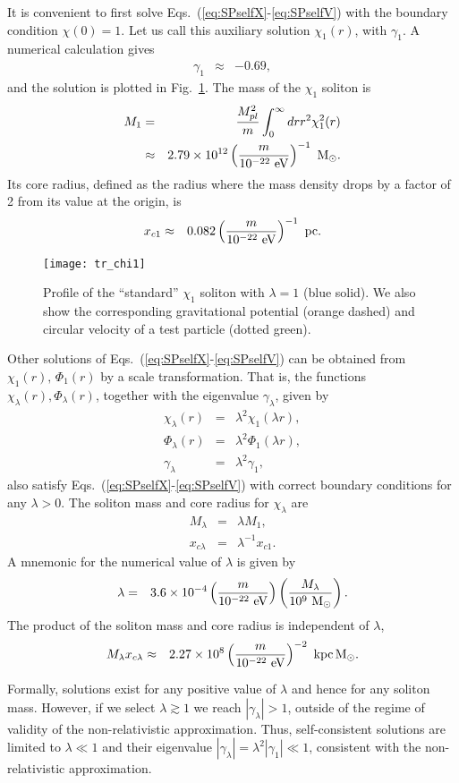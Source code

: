 \documentclass[aps,prd,floats,superscriptaddress,showpacs,nofootinbib,twocolumn,preprintnumbers]{revtex4-1}%
\def\be{\begin{eqnarray}}
\def\ee{\end{eqnarray}}
\def\no{\nonumber}
\begin{document}
It is convenient to first solve
Eqs.~(\ref{eq:SPselfX}-\ref{eq:SPselfV}) with the boundary condition
$\chi(0)=1$. Let us call this auxiliary solution $\chi_1(r)$, with
$\gamma_1$. A numerical calculation
gives~\cite{Chavanis:2011zi,Chavanis:2011zm,Marsh:2015wka} 
%
\be\label{eq:g1}\gamma_1&\approx&-0.69,\ee
%
and the solution is plotted in Fig.~\ref{fig:chi1}.
The mass of the $\chi_1$ soliton is
%
\be \label{eq:M1}M_1&=&\frac{M_{pl}^2}{m}\int_0^\infty drr^2\chi_1^2(r)\\
&\approx&2.79\times10^{12}\left(\frac{m}{10^{-22}~\rm eV}\right)^{-1}~{\rm M_\odot}.\no\ee
%
Its core radius, defined as the radius where the mass density drops by a factor of 2 from its value at the origin, is
%
\be x_{c1}&\approx&0.082\left(\frac{m}{10^{-22}~\rm eV}\right)^{-1}~{\rm pc}.\ee
%

\begin{figure}[htbp!]
\centering
\texttt{[image: tr\_chi1]}
\caption{Profile of the ``standard'' $\chi_1$ soliton with $\lambda=1$ (blue
  solid). We also show the corresponding gravitational potential
  (orange dashed) and circular velocity of a test particle (dotted green).
}\label{fig:chi1}
\end{figure}
%

Other solutions of Eqs.~(\ref{eq:SPselfX}-\ref{eq:SPselfV}) can be obtained from $\chi_1(r),\,\Phi_1(r)$ by a scale transformation. That is, the functions $\chi_\lambda(r),\Phi_\lambda(r)$, together with the eigenvalue $\gamma_\lambda$, given by
%
\be\chi_\lambda(r)&=&\lambda^2\chi_1(\lambda r),\label{eq:chilam}\\
\Phi_\lambda(r)&=&\lambda^2\Phi_1(\lambda r),\label{eq:Vlam}\\
\gamma_\lambda&=&\lambda^2\gamma_1,\label{eq:glam}\ee
%
also satisfy Eqs.~(\ref{eq:SPselfX}-\ref{eq:SPselfV}) with correct boundary conditions for any $\lambda>0$. The soliton mass and core radius for $\chi_\lambda$ are 
%
\be\label{eq:Mlambda} M_\lambda&=&\lambda M_1,\\
x_{c\lambda}&=&\lambda^{-1}x_{c1}.\ee
% 
%
%
A mnemonic for the numerical value of $\lambda$ is given by
%
\be\label{eq:lamM}\lambda&=&3.6\times10^{-4}\left(\frac{m}{10^{-22}~\rm eV}\right)\left(\frac{M_\lambda}{10^9~{\rm M_{\odot}}}\right).\ee
%
The product of the soliton mass and core radius is independent of $\lambda$,
%
\be\label{eq:MXsol} M_{\lambda}
x_{c\lambda}&\approx&2.27\times10^{8}\left(\frac{m}{10^{-22}~\rm
    eV}\right)^{-2}~{\rm kpc\,M_\odot}.
\ee 
%

Formally, solutions exist for any positive value of $\lambda$ and
hence for any soliton mass. However, if we select $\lambda\gtrsim1$ we
reach $|\gamma_\lambda|>1$, outside of the regime of validity of the
non-relativistic approximation. Thus, self-consistent solutions are
limited to $\lambda\ll1$  
and their eigenvalue $|\gamma_\lambda|=\lambda^2|\gamma_1|\ll1$,
consistent with the non-relativistic approximation.  
\end{document}
